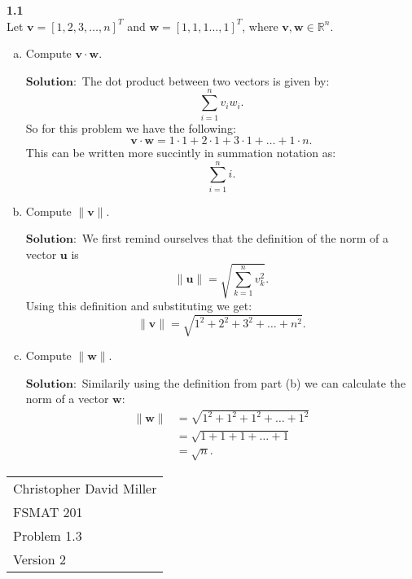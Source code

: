 \documentclass[12pt]{article}
\begin{document}
    \vspace{20pt}  %
    
    
    \textbf{1.1} \\  
    
        Let $\mathbf{v} = [1,2,3,\dots ,n]^T$ and $\mathbf{w} = [1,1,1\dots,1]^T$, where $\mathbf{v},\mathbf{w} \in \mathbb{R}^n$.
    
    
    \begin{enumerate}[(a)]
        \item Compute $\mathbf{v} \cdot \mathbf{w}$.
        
            $\textbf{Solution}:$ The dot product between two vectors is given by:\[
              \sum_{i=1}^n v_iw_i  
            .\]
            So for this problem we have the following:
            \[
            \mathbf{v} \cdot \mathbf{w} = 1\cdot1 + 2 \cdot 1 + 3 \cdot 1 + \dots + 1 \cdot n
            .\]
            This can be written more succintly in summation notation as:
            \[
            \sum_{i=1}^n i
            .\]
        \item Compute $\|\mathbf{v}\|$.        
        
            $\textbf{Solution}:$ We first remind ourselves that the definition of the norm of a vector $\mathbf{u}$ is \[
                \|  \mathbf{u} \| = \sqrt{\sum_{k=1}^{n}v_k^2}
            .\]
            Using this definition and substituting we get:\[
                \|  \mathbf{v} \| = \sqrt{1^2 + 2^2 + 3^2 + \dots +n^2}
            .\]
        \item Compute $\|\mathbf{w}\|$.
                
        $\textbf{Solution}:$ Similarily using the definition from part (b) we can calculate the norm of a vector $\mathbf{w}$:
        \begin{align*}
            \|  \mathbf{w} \|& = \sqrt{1^2 + 1^2 + 1^2 + \dots +1^2}\\
            & = \sqrt{1 + 1 + 1 + \dots +1}\\
            & = \sqrt{n}
        .\end{align*}
       
    \end{enumerate}

\newpage
\begin{flushright}
    \begin{tabular}{l}
    Christopher David Miller \\  %
    FSMAT 201 \\  %
    Problem 1.3 \\  %
    Version 2 \\ %
    \end{tabular}
    \end{flushright}
    \vspace{20pt}  %
    
\end{document}
